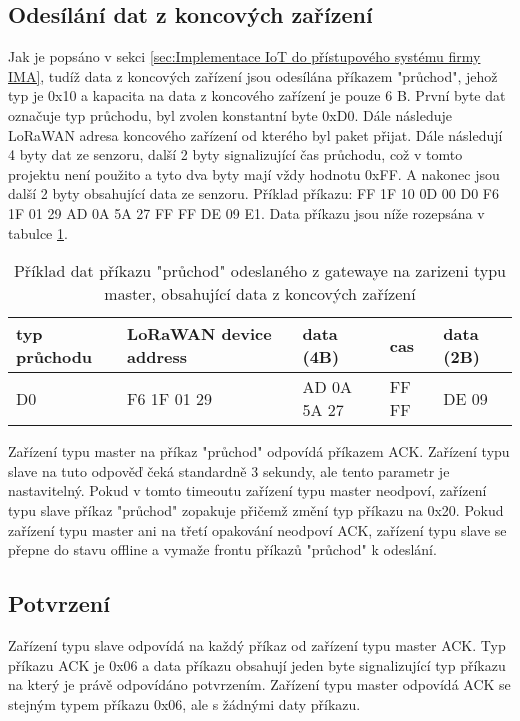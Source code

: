 \subsection{Odesílání dat z koncových zařízení}
\label{sec:Odesílání dat z koncových zařízení}
Jak je popsáno v sekci \ref{sec:Implementace IoT do přístupového systému firmy IMA}, tudíž data z koncových zařízení jsou odesílána příkazem "průchod", jehož typ je 0x10 a kapacita na data z koncového zařízení je pouze 6 B. 
První byte dat označuje typ průchodu, byl zvolen konstantní byte 0xD0. Dále následuje LoRaWAN adresa koncového zařízení od kterého byl paket přijat. Dále následují 4 byty dat ze senzoru, další 2 byty signalizující čas průchodu, což v tomto projektu není použito a tyto dva byty mají vždy hodnotu 0xFF. A nakonec jsou další 2 byty obsahující data ze senzoru.
Příklad příkazu: FF 1F 10 0D 00 D0 F6 1F 01 29 AD 0A 5A 27 FF FF DE 09 E1.
Data příkazu jsou níže rozepsána v tabulce \ref{table:prikladprikazpruchod}.

\begin{table}[!h]
    \centering
\begin{tabular}{ | p{1.5cm} | p{3cm} | p{2.5cm} | p{1.3cm} | p{1.3cm} |  }
 \hline
 typ průchodu & LoRaWAN device address & data (4B)     & cas   & data (2B) \\ \hline
 D0           & F6 1F 01 29            &  AD 0A 5A 27  & FF FF & DE 09     \\ 
 \hline
\end{tabular}
    \caption{Příklad dat příkazu "průchod" odeslaného z gatewaye na zarizeni typu master, obsahující data z koncových zařízení}
    \label{table:prikladprikazpruchod}
\end{table}

Zařízení typu master na příkaz "průchod" odpovídá příkazem ACK. Zařízení typu slave na tuto odpověď čeká standardně 3 sekundy, ale tento parametr je nastavitelný. Pokud v tomto timeoutu zařízení typu master neodpoví, zařízení typu slave příkaz "průchod" zopakuje přičemž změní typ příkazu na 0x20. Pokud zařízení typu master ani na třetí opakování neodpoví ACK, zařízení typu slave se přepne do stavu offline a vymaže frontu příkazů "průchod" k odeslání.

\subsection{Potvrzení}
Zařízení typu slave odpovídá na každý příkaz od zařízení typu master ACK. Typ příkazu ACK je 0x06 a data příkazu obsahují jeden byte signalizující typ příkazu na který je právě odpovídáno potvrzením.
Zařízení typu master odpovídá ACK se stejným typem příkazu 0x06, ale s žádnými daty příkazu.

